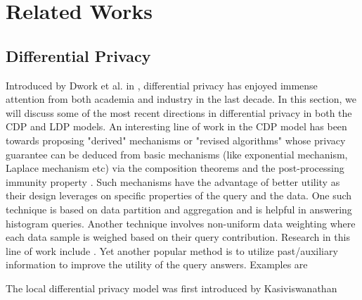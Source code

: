 \section{Related Works}
\subsection{Differential Privacy}
Introduced by Dwork et al. in \cite{Dork}, differential privacy has enjoyed immense attention from both academia and industry in the last decade. In this section, we will discuss some of the most recent directions in differential privacy in both the \textsf{CDP} and \textsf{LDP} models. An interesting line of work in the \textsf{CDP} model has been towards proposing "derived" mechanisms \cite{MVG} or  "revised algorithms" \cite{Blocki} whose privacy guarantee can be deduced from basic mechanisms (like exponential mechanism, Laplace mechanism etc) via the composition theorems and
the post-processing immunity property \cite{Dork}. Such mechanisms have the advantage of better utility as their design leverages on  specific properties of the query and the data.   One such technique is based on data partition and aggregation  \cite{AHP,DAWA,hist1,hist2,hist3,hist4,hist6,hist7,hist8} and is helpful in answering histogram queries. Another technique involves 
non-uniform data weighting where each data sample is weighed based on their query contribution. Research in this line of work include \cite{u1,u2,MWEM}. Yet another popular method is to utilize past/auxiliary information
to improve the utility of the query answers. Examples are \cite{A1,A2,A3,A4,A5,A6,A7,A8}
\par
The local differential privacy model was first introduced by Kasiviswanathan
